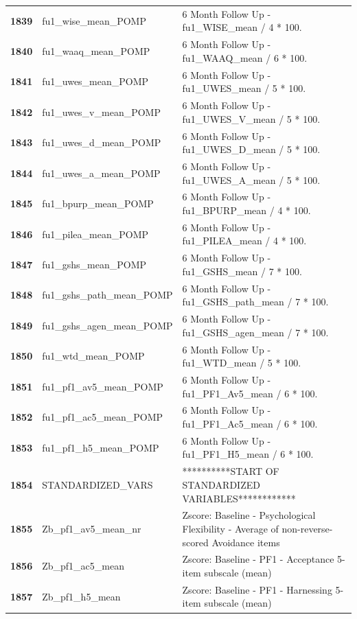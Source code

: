 \documentclass[
  letterpaper,
  DIV=11,
  numbers=noendperiod]{scrartcl}
\begin{document}
\begin{longtable}[t]{>{}cll}
\textbf{1839} & fu1\_wise\_mean\_POMP & 6 Month Follow Up - fu1\_WISE\_mean / 4 * 100.\\
\textbf{1840} & fu1\_waaq\_mean\_POMP & 6 Month Follow Up - fu1\_WAAQ\_mean / 6 * 100.\\
\addlinespace
\textbf{1841} & fu1\_uwes\_mean\_POMP & 6 Month Follow Up - fu1\_UWES\_mean / 5 * 100.\\
\textbf{1842} & fu1\_uwes\_v\_mean\_POMP & 6 Month Follow Up - fu1\_UWES\_V\_mean / 5 * 100.\\
\textbf{1843} & fu1\_uwes\_d\_mean\_POMP & 6 Month Follow Up - fu1\_UWES\_D\_mean / 5 * 100.\\
\textbf{1844} & fu1\_uwes\_a\_mean\_POMP & 6 Month Follow Up - fu1\_UWES\_A\_mean / 5 * 100.\\
\textbf{1845} & fu1\_bpurp\_mean\_POMP & 6 Month Follow Up - fu1\_BPURP\_mean / 4 * 100.\\
\addlinespace
\textbf{1846} & fu1\_pilea\_mean\_POMP & 6 Month Follow Up - fu1\_PILEA\_mean / 4 * 100.\\
\textbf{1847} & fu1\_gshs\_mean\_POMP & 6 Month Follow Up - fu1\_GSHS\_mean / 7 * 100.\\
\textbf{1848} & fu1\_gshs\_path\_mean\_POMP & 6 Month Follow Up - fu1\_GSHS\_path\_mean / 7 * 100.\\
\textbf{1849} & fu1\_gshs\_agen\_mean\_POMP & 6 Month Follow Up - fu1\_GSHS\_agen\_mean / 7 * 100.\\
\textbf{1850} & fu1\_wtd\_mean\_POMP & 6 Month Follow Up - fu1\_WTD\_mean / 5 * 100.\\
\addlinespace
\textbf{1851} & fu1\_pf1\_av5\_mean\_POMP & 6 Month Follow Up - fu1\_PF1\_Av5\_mean / 6 * 100.\\
\textbf{1852} & fu1\_pf1\_ac5\_mean\_POMP & 6 Month Follow Up - fu1\_PF1\_Ac5\_mean / 6 * 100.\\
\textbf{1853} & fu1\_pf1\_h5\_mean\_POMP & 6 Month Follow Up -  fu1\_PF1\_H5\_mean / 6 * 100.\\
\textbf{1854} & STANDARDIZED\_VARS & **********START OF STANDARDIZED VARIABLES************\\
\textbf{1855} & Zb\_pf1\_av5\_mean\_nr & Zscore:  Baseline - Psychological Flexibility - Average of non-reverse-scored Avoidance items\\
\addlinespace
\textbf{1856} & Zb\_pf1\_ac5\_mean & Zscore:  Baseline - PF1 - Acceptance 5-item subscale (mean)\\
\textbf{1857} & Zb\_pf1\_h5\_mean & Zscore:  Baseline - PF1 - Harnessing 5-item subscale (mean)\\

\end{longtable}
\end{document}
